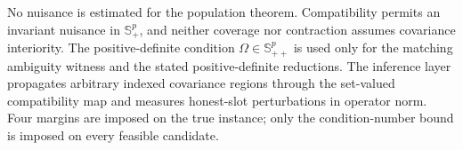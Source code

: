 No nuisance is estimated for the population theorem. Compatibility permits an invariant nuisance in \(\mathbb S_+^p\), and neither coverage nor contraction assumes covariance interiority. The positive-definite condition \(\Omega\in\mathbb S_{++}^p\) is used only for the matching ambiguity witness and the stated positive-definite reductions. The inference layer propagates arbitrary indexed covariance regions through the set-valued compatibility map and measures honest-slot perturbations in operator norm. Four margins are imposed on the true instance; only the condition-number bound is imposed on every feasible candidate.